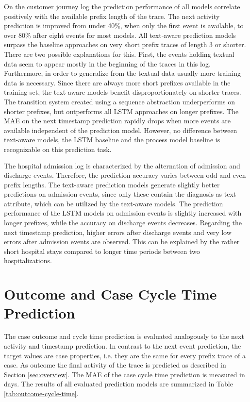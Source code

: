 On the customer journey log the prediction performance of all models correlate positively with the available prefix length of the trace.
The next activity prediction is improved from under 40\%, when only the first event is available, to over 80\% after eight events for most models.
All text-aware prediction models surpass the baseline approaches on very short prefix traces of length 3 or shorter.
There are two possible explanations for this.
First, the events holding textual data seem to appear mostly in the beginning of the traces in this log.
Furthermore, in order to generalize from the textual data usually more training data is necessary.
Since there are always more short prefixes available in the training set, the text-aware models benefit disproportionately on shorter traces.
The transition system created using a sequence abstraction underperforms on shorter prefixes, but outperforms all LSTM approaches on longer prefixes.
The MAE on the next timestamp prediction rapidly drops when more events are available independent of the prediction model.
However, no difference between text-aware models, the LSTM baseline and the process model baseline is recognizable on this prediction task.

The hospital admission log is characterized by the alternation of admission and discharge events.
Therefore, the prediction accuracy varies between odd and even prefix lengths.
The text-aware prediction models generate slightly better predictions on admission events, since only these contain the diagnosis as text attribute, which can be utilized by the text-aware models.
The prediction performance of the LSTM models on admission events is slightly increased with longer prefixes, while the accuracy on discharge events decreases.
Regarding the next timestamp prediction, higher errors after discharge events and very low errors after admission events are observed.
This can be explained by the rather short hospital stays compared to longer time periods between two hospitalizations.




\section{Outcome and Case Cycle Time Prediction}

The case outcome and cycle time prediction is evaluated analogously to the next activity and timestamp prediction.
In contrast to the next event prediction, the target values are case properties, i.e. they are the same for every prefix trace of a case.
As outcome the final activity of the trace is predicted as described in Section \ref{sec:overview}.
The MAE of the case cycle time prediction is measured in days.
The results of all evaluated prediction models are summarized in Table \ref{tab:outcome-cycle-time}.

